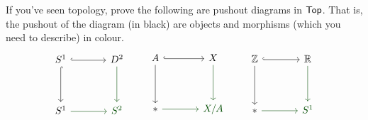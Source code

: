 
\begin{problem}\label{prob 6.6}
If you've seen topology, prove the following are pushout diagrams in $\mathsf{Top}$. That is, the pushout of the diagram (in black) are objects and morphisms (which you need to describe) in colour.
\[\begin{tikzcd}[row sep=huge, column sep = large]
S^1\arrow[d,hook] \arrow[r, hook] & D^2\arrow[d,darkgreen] \\
S^1\arrow[r,darkgreen]                  &   {\color{darkgreen}S^2} 
\end{tikzcd}
\qquad
\begin{tikzcd}[row sep=huge, column sep = large]
A\arrow[d] \arrow[r, hook] & X\arrow[d,darkgreen] \\
*  \arrow[r,darkgreen]        & {\color{darkgreen} X/A}    
\end{tikzcd}
\qquad
\begin{tikzcd}[row sep=huge, column sep = large]
\zz\arrow[d] \arrow[r, hook] & \rr\arrow[d,darkgreen] \\
*  \arrow[r,darkgreen]          & {\color{darkgreen} S^1}   
\end{tikzcd}\]
\end{problem}

\vspace*{0.1in}

